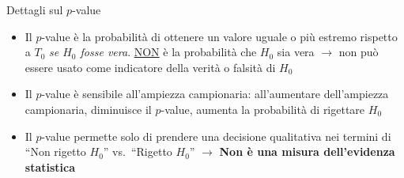 \documentclass[
  ignorenonframetext,
  compress, aspectratio=149]{beamer}
\providecommand{\tightlist}{%
  \setlength{\itemsep}{0pt}\setlength{\parskip}{0pt}}
\begin{document}
\begin{frame}{Dettagli sul \(p\)-value}
\label{dettagli-sul-p-value}
\begin{itemize}
\tightlist
\item
  Il \(p\)-value è la probabilità di ottenere un valore uguale o più
  estremo rispetto a \(T_0\) \emph{se \(H_0\) fosse vera}.
  \underline{NON} è la probabilità che \(H_0\) sia vera \(\rightarrow\)
  non può essere usato come indicatore della verità o falsità di \(H_0\)
\item
  Il \(p\)-value è sensibile all'ampiezza campionaria: all'aumentare
  dell'ampiezza campionaria, diminuisce il \(p\)-value, aumenta la
  probabilità di rigettare \(H_0\)
\item
  Il \(p\)-value permette solo di prendere una decisione qualitativa nei
  termini di ``Non rigetto \(H_0\)'' vs.~``Rigetto \(H_0\)''
  \(\rightarrow\) \textbf{Non è una misura dell'evidenza statistica}
\end{itemize}
\end{frame}
\end{document}
